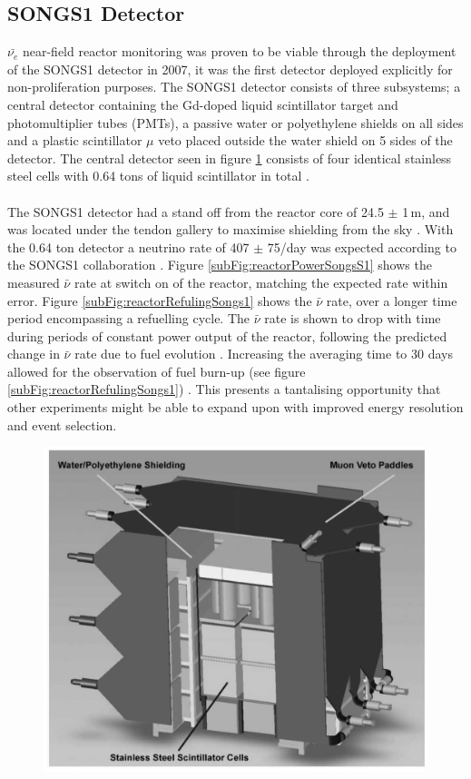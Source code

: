 \subsection{SONGS1 Detector}
$\bar{\nu_e}$ near-field reactor monitoring was proven to be viable through the deployment of the SONGS1 detector in 2007\cite{Bowden_2007}, it was the first detector deployed explicitly for non-proliferation purposes. The SONGS1 detector consists of three subsystems; a central detector containing the Gd-doped liquid scintillator target and photomultiplier tubes (PMTs), a passive water or polyethylene shields on all sides and a plastic scintillator $\mu$ veto placed outside the water shield on 5 sides of the detector. The central detector seen in figure \ref{fig:SongsS1Detector} consists of four identical stainless steel cells with 0.64 tons of liquid scintillator in total \cite{Bowden_2007}. 
\\\\The SONGS1 detector had a stand off from the reactor core of 24.5 $\pm$ 1\,m, and was located under the tendon gallery to maximise shielding from the sky \cite{Bowden_2007}. With the 0.64 ton detector a neutrino rate of 407 $\pm$ 75/day was expected according to the SONGS1 collaboration \cite{Bowden_2007}. Figure \ref{subFig:reactorPowerSongsS1} shows the measured $\bar{\nu}$ rate at switch on of the reactor, matching the expected rate within error. Figure \ref{subFig:reactorRefulingSongs1} shows the $\bar{\nu}$ rate, over a longer time period encompassing a refuelling cycle. The $\bar{\nu}$ rate is shown to drop with time during periods of constant power output of the reactor, following the predicted change in $\bar{\nu}$ rate due to fuel evolution \cite{Bowden_2008}. Increasing the averaging time to 30 days allowed for the observation of fuel burn-up (see figure \ref{subFig:reactorRefulingSongs1}) \cite{Bowden_2008}. This presents a tantalising opportunity that other experiments might be able to expand upon with improved energy resolution and event selection. %

\begin{figure}[!h]
 \centering
 \includegraphics[width=0.5\linewidth]{Chapter1/Figs/SongsS1Detector.jpg}
 \label{fig:SongsS1Detector}
\end{figure}

